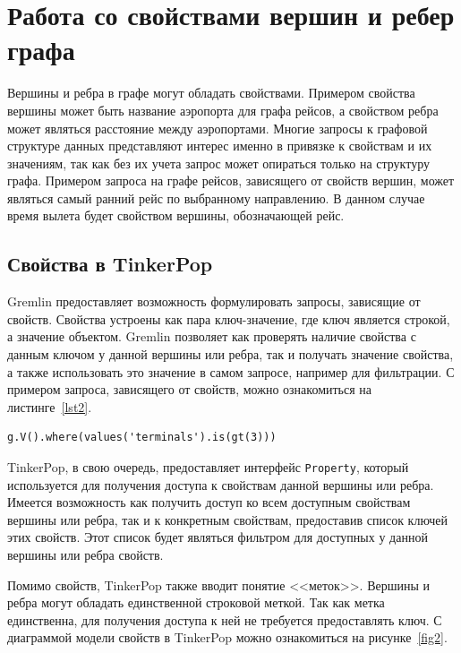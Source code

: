 \documentclass[times,specification,annotation]{itmo-student-thesis}
\begin{document}
\section{Работа со свойствами вершин и ребер графа}\label{props}

Вершины и ребра в графе могут обладать свойствами. Примером свойства вершины может быть название аэропорта для графа рейсов, а свойством ребра может являться расстояние между аэропортами.
Многие запросы к графовой структуре данных представляют интерес именно в привязке к свойствам и их значениям, так как без их учета запрос может опираться только на структуру графа. Примером запроса на графе рейсов, зависящего от свойств вершин, может являться самый ранний рейс по выбранному направлению. В данном случае время вылета будет свойством вершины, обозначающей рейс.

\subsection{Свойства в TinkerPop}

Gremlin предоставляет возможность формулировать запросы, зависящие от свойств. Свойства устроены как пара ключ-значение, где ключ является строкой, а значение объектом. Gremlin позволяет как проверять наличие свойства с данным ключом у данной вершины или ребра, так и получать  значение свойства, а также использовать это значение в самом запросе, например для фильтрации. С примером запроса, зависящего от свойств, можно ознакомиться на листинге~\ref{lst2}.

\begin{lstlisting}[float=!h,caption={Пример запроса на Gremlin, зависящего от свойств},label={lst2}]
g.V().where(values('terminals').is(gt(3)))
\end{lstlisting}

TinkerPop, в свою очередь, предоставляет интерфейс \texttt{Property}, который используется для получения доступа к свойствам данной вершины или ребра. Имеется возможность как получить доступ ко всем доступным свойствам вершины или ребра, так и к конкретным свойствам, предоставив список ключей этих свойств. Этот список будет являться фильтром для доступных у данной вершины или ребра свойств.

Помимо свойств, TinkerPop также вводит понятие <<меток>>. Вершины и ребра могут обладать единственной строковой меткой. Так как метка единственна, для получения доступа к ней не требуется предоставлять ключ. С диаграммой модели свойств в TinkerPop можно ознакомиться на рисунке~\ref{fig2}.
\end{document}
